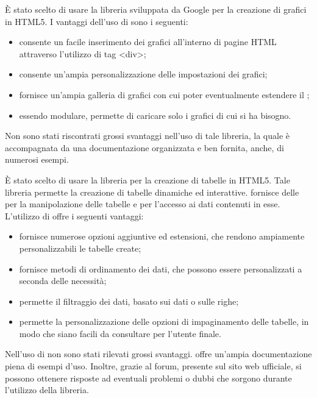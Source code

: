 È stato scelto di usare la libreria  sviluppata da Google per la creazione di grafici in HTML5.
I vantaggi dell'uso di  sono i seguenti:
\begin{itemize}
\item consente un facile inserimento dei grafici all'interno di pagine HTML attraverso l'utilizzo di tag <div>;
\item consente un'ampia personalizzazione delle impostazioni dei grafici;
\item fornisce un'ampia galleria di grafici con cui poter eventualmente estendere il ;
\item essendo modulare, permette di caricare solo i grafici di cui si ha bisogno.
\end{itemize}
Non sono stati riscontrati grossi svantaggi nell'uso di tale libreria, la quale è accompagnata da una documentazione organizzata e ben fornita, anche, di numerosi esempi.

È stato scelto di usare la libreria   per la creazione di tabelle in HTML5. Tale libreria permette la creazione di tabelle dinamiche ed interattive.  fornisce delle  per la manipolazione delle tabelle e per l'accesso ai dati contenuti in esse. 
L'utilizzo di  offre i seguenti vantaggi:
\begin{itemize}
\item fornisce numerose opzioni aggiuntive ed estensioni, che rendono ampiamente personalizzabili le tabelle create;
\item fornisce metodi di ordinamento dei dati, che possono essere personalizzati a seconda delle necessità;
\item permette il filtraggio dei dati, basato sui dati o sulle righe;
\item permette la personalizzazione delle opzioni di impaginamento delle tabelle, in modo che siano facili da consultare per l'utente finale.
\end{itemize}
Nell'uso di  non sono stati rilevati grossi svantaggi.  offre un'ampia documentazione piena di esempi d'uso. Inoltre, grazie al forum, presente sul sito web ufficiale, si possono ottenere risposte ad eventuali problemi o dubbi che sorgono durante l'utilizzo della libreria.

